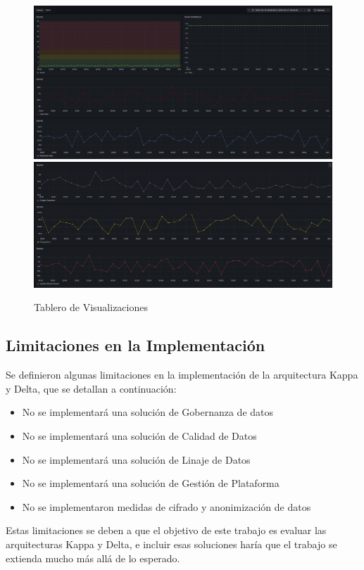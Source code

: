\begin{figure}[h]
    \centering
    \includegraphics[width=1\textwidth]{desarrollo/visualization1.png}
    \includegraphics[width=1\textwidth]{desarrollo/visualization2.png}
    \caption{Tablero de Visualizaciones}
    \label{fig:visualization}
\end{figure}
\clearpage

\subsection{Limitaciones en la Implementación}

Se definieron algunas limitaciones en la implementación de la arquitectura Kappa y Delta, que se detallan a continuación:
\begin{itemize}
    \item No se implementará una solución de Gobernanza de datos
    \item No se implementará una solución de Calidad de Datos
    \item No se implementará una solución de Linaje de Datos
    \item No se implementará una solución de Gestión de Plataforma
    \item No se implementaron medidas de cifrado y anonimización de datos
\end{itemize}

Estas limitaciones se deben a que el objetivo de este trabajo es evaluar las arquitecturas Kappa y Delta,
e incluir esas soluciones haría que el trabajo se extienda mucho más allá de lo esperado.